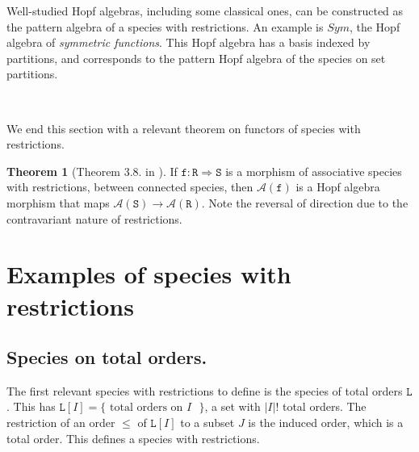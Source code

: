 \documentclass[12pt, reqno]{amsart}
\theoremstyle{definition}
\newtheorem{thm}{Theorem}[section]
\newcommand{\prR}{\mathtt{R}}
\begin{document}

Well-studied Hopf algebras, including some classical ones, can be constructed as the pattern algebra of a species with restrictions.
An example is $Sym$, the Hopf algebra of \textit{symmetric functions}.
This Hopf algebra has a basis indexed by partitions, and corresponds to the pattern Hopf algebra of the species on set partitions.

\

We end this section with a relevant theorem on functors of species with restrictions.

\begin{thm}[Theorem 3.8. in \cite{Penaguiao2020}]\label{thm:functoriality}
    If $\mathtt{f} : \prR \Rightarrow \mathtt{S}$ is a morphism of associative species with restrictions, between connected species, then $\mathcal A(\mathtt{f})$ is a Hopf algebra morphism that maps $\mathcal A(\mathtt{S}) \to \mathcal A(\mathtt{R})$. Note the reversal of direction due to the contravariant nature of restrictions.
\end{thm}



\section{Examples of species with restrictions \label{sec:species_restrictions}}

\subsection{Species on total orders.\label{sec:specieslinearorders}}

The first relevant species with restrictions to define is the species of total orders $\mathtt{L}$.
This has $\mathtt{L}[I] = \{\text{ total orders on $I$ }\}$, a set with $|I|!$ total orders.
The restriction of an order $\leq$ of $\mathtt{L}[I]$ to a subset $J$ is the induced order, which is a total order.
This defines a species with restrictions.
\end{document}
